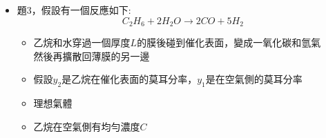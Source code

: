\documentclass[../main.tex]{subfiles}
\begin{document}
\begin{itemize}
\begin{itemize}
    \begin{equation}
      J_A = -C D_{AB} \frac{dy_A}{dz}
    \end{equation}
    合併後:
    \begin{equation}
      N_A = -C D_{AB} \frac{dy_A}{dz} + y_A N_T
    \end{equation}
    \item molar and mass flux:\\
    mass flux:$n_i$\\
    \begin{equation}
      n_i = M_iN_i
    \end{equation}
    單位是$[kg/m^2 s]$\\
    Total mass flux:
    \begin{equation}
      n_T = \sum_i n_i = \sum_i M_i N_i
    \end{equation}
    mixture density:
    \begin{equation}
      \rho = \sum_i C_i M_i
    \end{equation}
    Mass Fraction:
    \begin{equation}
      w_i = \frac{n_i}{n_T} = \frac{C_i M_i}{\rho} = \frac{\rho_i}{\rho}
    \end{equation}
    Mass average velocity:
    \begin{equation}
      V_m = \frac{n_T}{\rho} = \frac{\sum_i n_i}{\sum_i C_i M_i}
    \end{equation}
    Mass based Diffusivity flux:
    \begin{equation}
      j_i = n_i - w_i n_T, \quad n_i = j_i + w_i n_T 
    \end{equation}
    以及質量守恆
    \begin{equation}
      V_m = \frac{n_T}{\rho}, \quad \sum_i j_i = 0
    \end{equation}
  \end{itemize}
  \item 題3，假設有一個反應如下:
  \begin{equation}
    C_2H_6 + 2H_2O \rightarrow 2CO +5H_2
  \end{equation}
  \begin{itemize}
    \item 乙烷和水穿過一個厚度$L$的膜後碰到催化表面，變成一氧化碳和氫氣\\
    然後再擴散回薄膜的另一邊
    \item 假設$y_2$是乙烷在催化表面的莫耳分率，$y_1$是在空氣側的莫耳分率
    \item 理想氣體
    \item 乙烷在空氣側有均勻濃度$C$

\end{itemize}
\end{itemize}
\end{document}
